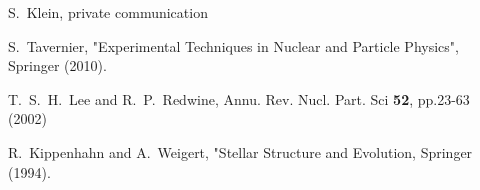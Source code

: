 \documentclass[twocolumn, preprintnumbers,amsmath,amssymb,prd, superscriptaddress]{revtex4}
\begin{document}
\begin{thebibliography}{99}
S.~Klein, private communication

S.~Tavernier, "Experimental Techniques in Nuclear and Particle Physics", Springer (2010).

T.~S.~H.~Lee and R.~P.~Redwine,
 Annu. Rev. Nucl. Part. Sci {\bf 52}, pp.23-63 (2002)

R.~Kippenhahn and A.~Weigert, "Stellar Structure and Evolution, Springer (1994).



\end{thebibliography}
\end{document}
